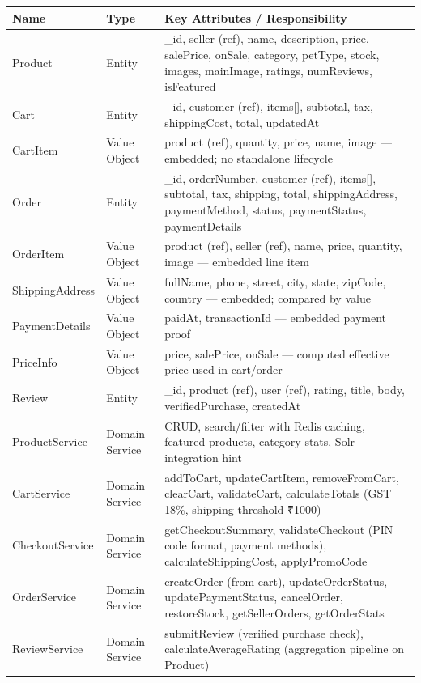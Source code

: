 \documentclass[12pt,a4paper]{article}
\begin{document}
\begin{center}
\begin{tabular}{@{}p{3.5cm}p{2cm}p{8.5cm}@{}}
\toprule
\textbf{Name} & \textbf{Type} & \textbf{Key Attributes / Responsibility} \\
\midrule
Product & Entity & \_id, seller (ref), name, description, price, salePrice, onSale, category, petType, stock, images, mainImage, ratings, numReviews, isFeatured \\
Cart & Entity & \_id, customer (ref), items[], subtotal, tax, shippingCost, total, updatedAt \\
CartItem & Value Object & product (ref), quantity, price, name, image — embedded; no standalone lifecycle \\
Order & Entity & \_id, orderNumber, customer (ref), items[], subtotal, tax, shipping, total, shippingAddress, paymentMethod, status, paymentStatus, paymentDetails \\
OrderItem & Value Object & product (ref), seller (ref), name, price, quantity, image — embedded line item \\
ShippingAddress & Value Object & fullName, phone, street, city, state, zipCode, country — embedded; compared by value \\
PaymentDetails & Value Object & paidAt, transactionId — embedded payment proof \\
PriceInfo & Value Object & price, salePrice, onSale — computed effective price used in cart/order \\
Review & Entity & \_id, product (ref), user (ref), rating, title, body, verifiedPurchase, createdAt \\
ProductService & Domain Service & CRUD, search/filter with Redis caching, featured products, category stats, Solr integration hint \\
CartService & Domain Service & addToCart, updateCartItem, removeFromCart, clearCart, validateCart, calculateTotals (GST 18\%, shipping threshold ₹1000) \\
CheckoutService & Domain Service & getCheckoutSummary, validateCheckout (PIN code format, payment methods), calculateShippingCost, applyPromoCode \\
OrderService & Domain Service & createOrder (from cart), updateOrderStatus, updatePaymentStatus, cancelOrder, restoreStock, getSellerOrders, getOrderStats \\
ReviewService & Domain Service & submitReview (verified purchase check), calculateAverageRating (aggregation pipeline on Product) \\
\bottomrule
\end{tabular}
\end{center}
\end{document}
